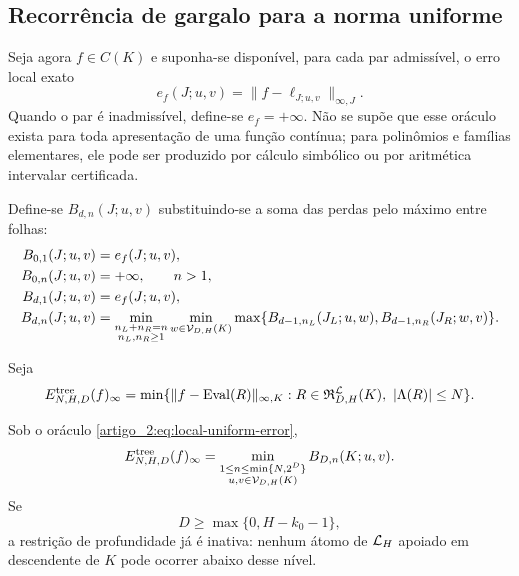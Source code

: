 \subsection{Recorrência de gargalo para a norma uniforme}

Seja agora $f\in C(K)$ e suponha-se disponível, para cada par admissível, o erro
local exato
\begin{equation}
 e_f(J;u,v)=\|f-\ell_{J;u,v}\|_{\infty,J}.
 \label{artigo_2:eq:local-uniform-error}
\end{equation}
Quando o par é inadmissível, define-se $e_f=+\infty$. Não se supõe que esse oráculo
exista para toda apresentação de uma função contínua; para polinômios e
famílias elementares, ele pode ser produzido por cálculo simbólico ou por
aritmética intervalar certificada.

Define-se $B_{d,n}(J;u,v)$ substituindo-se a soma das perdas pelo máximo entre folhas:
\begin{align}
 B_{0,1}(J;u,v)&=e_f(J;u,v),\label{artigo_2:eq:bottleneck-base}\\
 B_{0,n}(J;u,v)&=+\infty,\qquad n>1,\notag\\
 B_{d,1}(J;u,v)&=e_f(J;u,v),\label{artigo_2:eq:bottleneck-one}\\
 B_{d,n}(J;u,v)
 &=\min_{\substack{n_L+n_R=n\\n_L,n_R\ge1}}
 \min_{w\in\mathcal{V}_{D,H}(K)}
 \max\{B_{d-1,n_L}(J_L;u,w),
       B_{d-1,n_R}(J_R;w,v)\}.
 \label{artigo_2:eq:bottleneck-recurrence}
\end{align}

Seja
\begin{equation}
 E_{N,H,D}^{\rm tree}(f)_\infty
 =\min\{\|f-\operatorname{Eval}(R)\|_{\infty,K}:
 R\in\mathfrak{R}_{D,H}^{\mathcal{L}}(K),\
 |\Lambda(R)|\le N\}.
 \label{artigo_2:eq:truncated-tree-error}
\end{equation}

\begin{theorem}\label{map:artigo_2:8.2}
\label{artigo_2:thm:bottleneck}
Sob o oráculo \eqref{artigo_2:eq:local-uniform-error},
\begin{equation}
 E_{N,H,D}^{\rm tree}(f)_\infty
 =\min_{\substack{1\le n\le\min\{N,2^D\}\\
                  u,v\in\mathcal{V}_{D,H}(K)}}
 B_{D,n}(K;u,v).
 \label{artigo_2:eq:bottleneck-optimum}
\end{equation}
Se
\begin{equation}
 D\ge \max\{0,H-k_0-1\},
 \label{artigo_2:eq:depth-inactive}
\end{equation}
a restrição de profundidade já é inativa: nenhum átomo de $\mathcal{L}_H$
apoiado em descendente de $K$ pode ocorrer abaixo desse nível.
\end{theorem}

